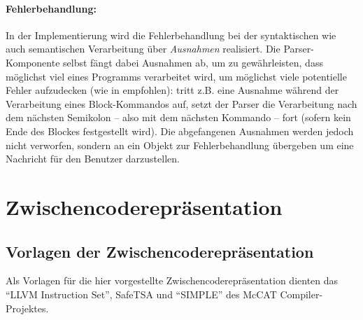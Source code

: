 \documentclass[twoside,a4paper,fleqn,12pt]{book}
\begin{document}
\paragraph{Fehlerbehandlung:}
In der Implementierung wird die Fehlerbehandlung bei der syntaktischen wie auch semantischen Verarbeitung über \emph{Ausnahmen}
realisiert. Die Parser-Komponente selbst fängt dabei Ausnahmen ab, um zu gewährleisten, dass möglichst viel eines
Programms verarbeitet wird, um möglichst viele potentielle Fehler aufzudecken (wie in \cite{wirth_compiler} empfohlen):
tritt z.B. eine Ausnahme während der Verarbeitung eines Block-Kommandos auf, setzt der Parser die
Verarbeitung nach dem nächsten Semikolon -- also mit dem nächsten Kommando -- fort (sofern kein Ende
des Blockes festgestellt wird).
Die abgefangenen Ausnahmen werden jedoch nicht verworfen, sondern an ein Objekt zur Fehlerbehandlung
übergeben um eine Nachricht für den Benutzer darzustellen.



\newpage
\section{Zwischencoderepräsentation}
\label{zcr}




\subsection{Vorlagen der Zwischencoderepräsentation}

Als Vorlagen für die hier vorgestellte Zwischencoderepräsentation dienten das ``LLVM Instruction Set'',
SafeTSA und ``SIMPLE'' des McCAT Compiler-Projektes.
\end{document}
